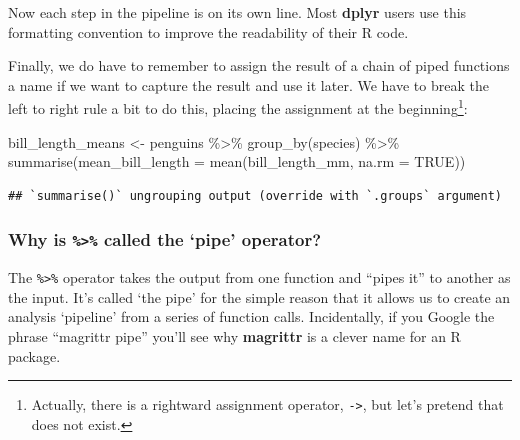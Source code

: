 \documentclass[
]{book}
\newenvironment{Shaded}{\begin{snugshade}}{\end{snugshade}}
\newcommand{\AttributeTok}[1]{\textcolor[rgb]{0.77,0.63,0.00}{#1}}
\newcommand{\ConstantTok}[1]{\textcolor[rgb]{0.00,0.00,0.00}{#1}}
\newcommand{\FunctionTok}[1]{\textcolor[rgb]{0.00,0.00,0.00}{#1}}
\newcommand{\NormalTok}[1]{#1}
\newcommand{\OtherTok}[1]{\textcolor[rgb]{0.56,0.35,0.01}{#1}}
\newcommand{\SpecialCharTok}[1]{\textcolor[rgb]{0.00,0.00,0.00}{#1}}
\newenvironment{greybox}{
  \definecolor{shadecolor}{rgb}{0.95,0.95,0.95}  %
  \color{black}
  \begin{shaded}}
 {\end{shaded}}
\newenvironment{infobox}[1]
  {
  \begin{itemize}
  \renewcommand{\labelitemi}{
    \raisebox{-.7\height}[0pt][0pt]{
      {\setkeys{Gin}{width=3em,keepaspectratio}
        \texttt{[image: images/\#1]}}
    }
  }
  \setlength{\fboxsep}{1em}
  \begin{greybox}
  \item
  }
  {
  \end{greybox}
  \end{itemize}
  }
\begin{document}
Now each step in the pipeline is on its own line. Most \textbf{dplyr} users use this formatting convention to improve the readability of their R code.

Finally, we do have to remember to assign the result of a chain of piped functions a name if we want to capture the result and use it later. We have to break the left to right rule a bit to do this, placing the assignment at the beginning\footnote{Actually, there is a rightward assignment operator, \texttt{-\textgreater{}}, but let's pretend that does not exist.}:

\begin{Shaded}
\begin{Highlighting}[]
\NormalTok{bill\_length\_means }\OtherTok{\textless{}{-}} 
\NormalTok{  penguins }\SpecialCharTok{\%\textgreater{}\%} 
  \FunctionTok{group\_by}\NormalTok{(species) }\SpecialCharTok{\%\textgreater{}\%} 
  \FunctionTok{summarise}\NormalTok{(}\AttributeTok{mean\_bill\_length =} \FunctionTok{mean}\NormalTok{(bill\_length\_mm, }\AttributeTok{na.rm =} \ConstantTok{TRUE}\NormalTok{))}
\end{Highlighting}
\end{Shaded}

\begin{verbatim}
## `summarise()` ungrouping output (override with `.groups` argument)
\end{verbatim}

\begin{infobox}{information}

\hypertarget{why-is-called-the-pipe-operator}{%
\subsubsection*{\texorpdfstring{Why is \texttt{\%\textgreater{}\%} called the `pipe' operator?}{Why is \%\textgreater\% called the `pipe' operator?}}\label{why-is-called-the-pipe-operator}}

The \texttt{\%\textgreater{}\%} operator takes the output from one function and ``pipes it'' to another as the input. It's called `the pipe' for the simple reason that it allows us to create an analysis `pipeline' from a series of function calls. Incidentally, if you Google the phrase ``magrittr pipe'' you'll see why \textbf{magrittr} is a clever name for an R package.

\end{infobox}
\end{document}
